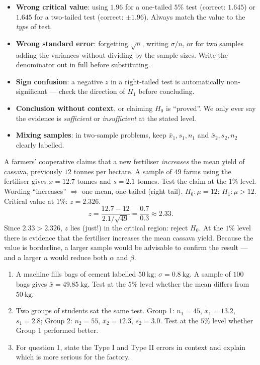 \documentclass[11pt]{article}
\begin{document}
\begin{attention}
\begin{itemize}
\item \textbf{Wrong critical value}: using $1.96$ for a one-tailed $5\%$ test (correct: $1.645$) or $1.645$ for a two-tailed test (correct: $\pm1.96$). Always match the value to the \emph{type} of test.
\item \textbf{Wrong standard error}: forgetting $\sqrt{n}$, writing $\sigma/n$, or for two samples adding the variances without dividing by the sample sizes. Write the denominator out in full before substituting.
\item \textbf{Sign confusion}: a negative $z$ in a right-tailed test is automatically non-significant — check the direction of $H_1$ before concluding.
\item \textbf{Conclusion without context}, or claiming $H_0$ is ``proved''. We only ever say the evidence is \emph{sufficient} or \emph{insufficient} at the stated level.
\item \textbf{Mixing samples}: in two-sample problems, keep $\bar{x}_1, s_1, n_1$ and $\bar{x}_2, s_2, n_2$ clearly labelled.
\end{itemize}
\end{attention}

\begin{exoresolu}
A farmers' cooperative claims that a new fertiliser \emph{increases} the mean yield of cassava, previously $12$ tonnes per hectare. A sample of $49$ farms using the fertiliser gives $\bar{x}=12.7$ tonnes and $s=2.1$ tonnes. Test the claim at the $1\%$ level.
\tcblower
Wording ``increases'' $\Rightarrow$ one mean, one-tailed (right tail).
$H_0:\mu=12$; $H_1:\mu>12$. Critical value at $1\%$: $z=2.326$.
\[ z=\frac{12.7-12}{2.1/\sqrt{49}}=\frac{0.7}{0.3}\approx 2.33. \]
Since $2.33 > 2.326$, $z$ lies (just!) in the critical region: reject $H_0$. At the $1\%$ level there is evidence that the fertiliser increases the mean cassava yield. Because the value is borderline, a larger sample would be advisable to confirm the result — and a larger $n$ would reduce both $\alpha$ and $\beta$.
\end{exoresolu}

\begin{exercice}[Practice]
\begin{enumerate}
\item A machine fills bags of cement labelled $50\ \mathrm{kg}$; $\sigma = 0.8\ \mathrm{kg}$. A sample of $100$ bags gives $\bar{x}=49.85\ \mathrm{kg}$. Test at the $5\%$ level whether the mean differs from $50\ \mathrm{kg}$.
\item Two groups of students sat the same test. Group 1: $n_1=45$, $\bar{x}_1=13.2$, $s_1=2.8$; Group 2: $n_2=55$, $\bar{x}_2=12.3$, $s_2=3.0$. Test at the $5\%$ level whether Group 1 performed better.
\item For question 1, state the Type I and Type II errors in context and explain which is more serious for the factory.
\end{enumerate}
\end{exercice}
\end{document}
